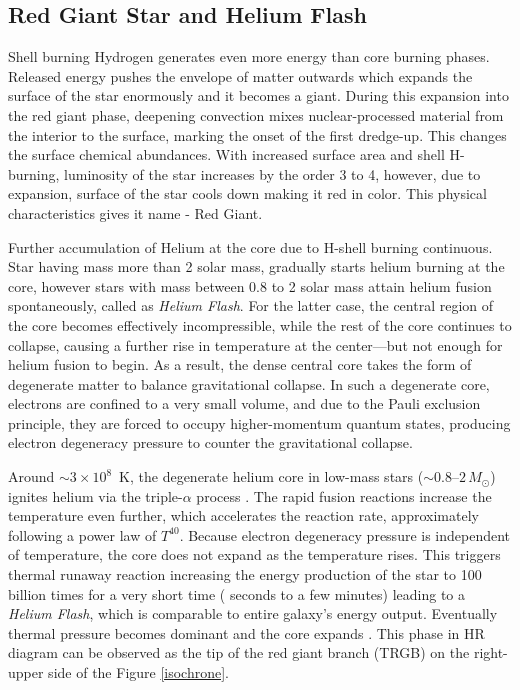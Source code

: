 


\subsection{Red Giant Star and Helium Flash}


Shell burning Hydrogen generates even more energy than core burning phases. Released energy pushes the envelope of matter outwards which expands the surface of the star enormously and it becomes a giant. During this expansion into the red giant phase, deepening convection mixes nuclear-processed material from the interior to the surface, marking the onset of the first dredge-up. This changes the surface chemical abundances. With increased surface area and shell H-burning, luminosity of the star increases by the order 3 to 4, however, due to expansion, surface of the star cools down making it red in color. This physical characteristics gives it name - Red Giant. 



Further accumulation of Helium at the core due to H-shell burning continuous. Star having mass more than 2 solar mass, gradually starts helium burning at the core, however stars with mass between 0.8 to 2 solar mass attain helium fusion spontaneously, called as \textit{Helium Flash}. For the latter case, the central region of the core becomes effectively incompressible, while the rest of the core continues to collapse, causing a further rise in temperature at the center—but not enough for helium fusion to begin. As a result, the dense central core takes the form of degenerate matter to balance gravitational collapse. In such a degenerate core, electrons are confined to a very small volume, and due to the Pauli exclusion principle, they are forced to occupy higher-momentum quantum states, producing electron degeneracy pressure to counter the gravitational collapse. 





Around $\sim 3\times 10^8$~K, the degenerate helium core in low-mass stars ($\sim 0.8$--$2\,M_\odot$) ignites helium via the triple-$\alpha$ process \citep{1954hoyle}. The rapid fusion reactions increase the temperature even further, which accelerates the reaction rate, approximately following a power law of $T^{40}$. Because electron degeneracy pressure is independent of temperature, the core does not expand as the temperature rises. This triggers thermal runaway reaction increasing the energy production of the star to 100 billion times for a very short time  ( seconds to a few minutes) leading to a \textit{Helium Flash}, which is comparable to entire galaxy's energy output. Eventually thermal pressure becomes dominant and the core expands \citep{McQuinn2019}. This phase in HR diagram can be observed as the tip of the red giant branch (TRGB) on the right-upper side of the Figure \ref{isochrone}. 

